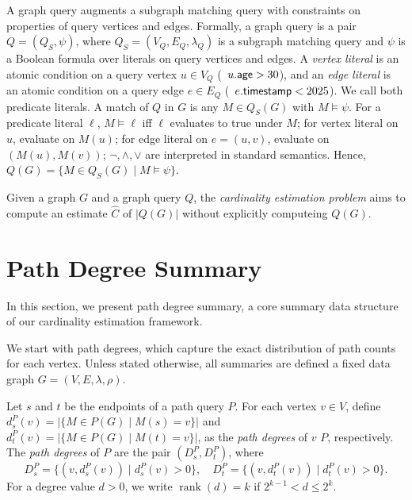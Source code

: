 A graph query augments a subgraph matching query with constraints on properties
 of query vertices and edges. Formally, a graph query is  a pair
 $Q=(Q_S,\psi)$, where $Q_S=(V_Q,E_Q,\lambda_Q)$ is a subgraph matching
 query and
 $\psi$ is a Boolean formula over literals on query vertices and edges.
A \emph{vertex literal} is an atomic condition on a query vertex $u\in
V_Q$ (\eg~$u.{\mathsf{age}}>30$), and an \emph{edge literal} is an atomic
condition on a query edge $e\in E_Q$ (\eg~$e.{\mathsf{timestamp}}<2025$). We
call both predicate literals. %
A match of $Q$ in $G$ is any $M\in Q_S(G)$ with $M\models\psi$. For a
predicate literal $\ell$, $M\models\ell$ iff $\ell$ evaluates to true
under $M$; for vertex literal on $u$, evaluate on $M(u)$; for edge
literal on $e=(u,v)$, evaluate on $(M(u),M(v))$; $\neg,\land,\lor$ are
interpreted in standard semantics. %
Hence, $Q(G)=\{M\in Q_S(G)\mid M\models\psi\}$.

 Given a graph $G$ and a graph query
$Q$,  the \emph{cardinality estimation problem} aims to  compute an
estimate $\hat{C}$ of $|Q(G)|$ without explicitly computeing $Q(G)$. %


\begin{example}
\end{example}

\section{Path Degree Summary}

In this section, we present {path degree summary}, a core
summary data structure of our cardinality estimation framework. 

\vspace{.25em}%
We start with path degrees, which capture the exact distribution of
path counts for each vertex.  Unless stated otherwise, all summaries are
defined \wrt a fixed data graph $G=(V,E,\lambda,\rho)$. 

Let $s$ and $t$ be the endpoints of a path query $P$. For each vertex
$v\in V$, define $d_s^P(v)=\bigl|\{M\in P(G)\mid M(s)=v\}\bigr|$ and
$d_t^P(v)=\bigl|\{M\in P(G)\mid M(t)=v\}\bigr|$, as the \emph{path
degrees} of $v$ \wrt $P$, respectively. %
The \emph{path degrees} of $P$ are the pair
$(D_s^P,D_t^P)$, where
\[D_s^P=\{(v,d_s^P(v))\mid d_s^P(v)>0\}, \quad D_t^P=\{(v,d_t^P(v))\mid
d_t^P(v)>0\}.\] %
For a degree value $d>0$, we write $\operatorname{rank}(d)=k$ if
$2^{k-1}<d\le 2^k$.


